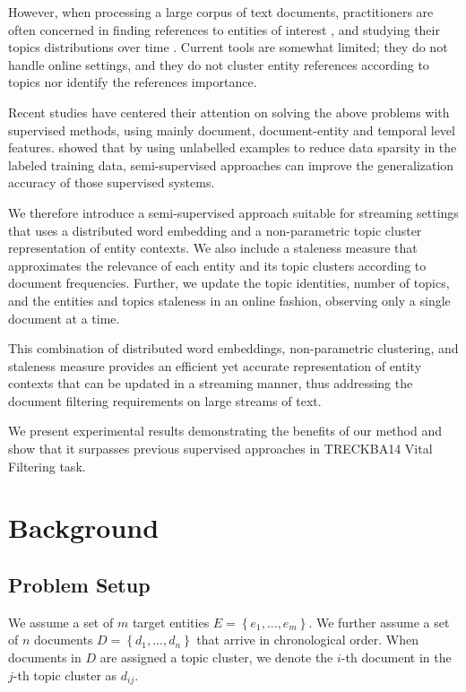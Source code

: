 \documentclass{article}
\begin{document}
However, when processing a large corpus of text documents, practitioners are often concerned in finding references to entities of interest \cite{RaoMD10, choi2007}, and studying their topics distributions over time \cite{blei12}. Current tools are somewhat limited; they do not handle online settings, and they do not cluster entity references according to topics nor identify the references importance.

Recent studies \cite{xitong13, bouvier13, efron13, zhang13, bellogin13} have centered their attention on solving the above problems with supervised methods, using mainly document, document-entity and temporal level features. \citet{Turian10wordrepresentations} showed that by using unlabelled examples to reduce data sparsity in the labeled training data, semi-supervised approaches can improve the generalization accuracy of those supervised systems.

We therefore introduce a semi-supervised approach suitable for streaming settings that uses a distributed word embedding and a non-parametric topic cluster representation of entity contexts. We also include a staleness measure that approximates the relevance of each entity and its topic clusters according to document frequencies. Further, we update the topic identities, number of topics, and the entities and topics staleness in an online fashion, observing only a single document at a time.

This combination of distributed word embeddings, non-parametric clustering, and staleness measure provides an efficient yet accurate representation of entity contexts that can be updated in a streaming manner, thus addressing the document filtering requirements on large streams of text.

We present experimental results demonstrating the benefits of our method and show that it surpasses previous supervised approaches in TRECKBA14 Vital Filtering task.

\section{Background}
\label{background}

\subsection{Problem Setup}
\label{setup}

We assume a set of $m$ target entities $E = \left\{ {e_1, ..., e_m}\right\}$. We further assume a set of $n$ documents $D = \left\{ {d_{1}, ..., d_{n}}\right\}$ that arrive in chronological order. 
When documents in $D$ are assigned a topic cluster, we denote the $i$-th document in the $j$-th topic cluster as $d_{ij}$. 
\end{document}
